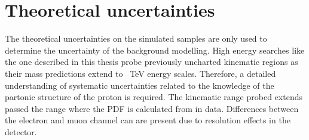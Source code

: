\section{Theoretical uncertainties}\label{sec:sysmc:theory}
The theoretical uncertainties on the simulated samples are only used to determine the uncertainty of the background modelling. High energy searches like the one described in this thesis probe previously uncharted kinematic regions as their mass predictions extend to \SI{}{\tera\electronvolt} energy scales. Therefore, a detailed understanding of systematic uncertainties related to the knowledge of the partonic structure of the proton is required. The kinematic range probed extends passed the range where the PDF is calculated from in data. Differences between the electron and muon channel can are present due to resolution effects in the detector. 

